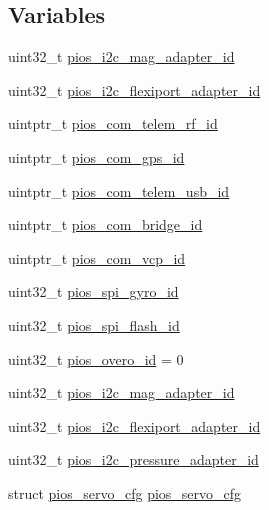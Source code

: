 \subsection*{\-Variables}
\begin{DoxyCompactItemize}
\item 
uint32\-\_\-t \hyperlink{group___revolution_gaf4677b648f4c1c967ab57a2994d6f1a6}{pios\-\_\-i2c\-\_\-mag\-\_\-adapter\-\_\-id}
\item 
uint32\-\_\-t \hyperlink{group___revolution_ga20b68de0b754d943d653d816aad86148}{pios\-\_\-i2c\-\_\-flexiport\-\_\-adapter\-\_\-id}
\item 
uintptr\-\_\-t \hyperlink{group___revolution_gae48e848f715b08971e23528feee79339}{pios\-\_\-com\-\_\-telem\-\_\-rf\-\_\-id}
\item 
uintptr\-\_\-t \hyperlink{group___revolution_ga05dca72c42c6c2b33fa62b8ee0fcb2ea}{pios\-\_\-com\-\_\-gps\-\_\-id}
\item 
uintptr\-\_\-t \hyperlink{group___revolution_ga513cc36d72b76de2fcb75ff233a79a4a}{pios\-\_\-com\-\_\-telem\-\_\-usb\-\_\-id}
\item 
uintptr\-\_\-t \hyperlink{group___revolution_gac040f05fa048688ee0269c2768698a14}{pios\-\_\-com\-\_\-bridge\-\_\-id}
\item 
uintptr\-\_\-t \hyperlink{group___revolution_gaaeb3e0d65ed5c6e7b921c54e1ad905db}{pios\-\_\-com\-\_\-vcp\-\_\-id}
\item 
uint32\-\_\-t \hyperlink{group___revolution_gaa3af759a1b634a729e4688dc40026875}{pios\-\_\-spi\-\_\-gyro\-\_\-id}
\item 
uint32\-\_\-t \hyperlink{group___revolution_gaebc54f2c5fc298fad979df4d9bd1414b}{pios\-\_\-spi\-\_\-flash\-\_\-id}
\item 
uint32\-\_\-t \hyperlink{group___revolution_ga6068626ce5d15d09ba077204ea2fd43d}{pios\-\_\-overo\-\_\-id} = 0
\item 
uint32\-\_\-t \hyperlink{group___revolution_gaf4677b648f4c1c967ab57a2994d6f1a6}{pios\-\_\-i2c\-\_\-mag\-\_\-adapter\-\_\-id}
\item 
uint32\-\_\-t \hyperlink{group___revolution_ga20b68de0b754d943d653d816aad86148}{pios\-\_\-i2c\-\_\-flexiport\-\_\-adapter\-\_\-id}
\item 
uint32\-\_\-t \hyperlink{group___revolution_gaeae0f7b45b9d077ba85b774812c03550}{pios\-\_\-i2c\-\_\-pressure\-\_\-adapter\-\_\-id}
\item 
struct \hyperlink{structpios__servo__cfg}{pios\-\_\-servo\-\_\-cfg} \hyperlink{group___revolution_ga57a87ef16d7949a9cc3589efc8d88a28}{pios\-\_\-servo\-\_\-cfg}

\end{DoxyCompactItemize}
